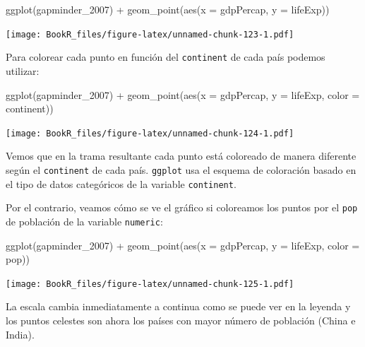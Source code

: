 \documentclass[
]{book}
\newenvironment{Shaded}{\begin{snugshade}}{\end{snugshade}}
\newcommand{\AttributeTok}[1]{\textcolor[rgb]{0.77,0.63,0.00}{#1}}
\newcommand{\FunctionTok}[1]{\textcolor[rgb]{0.00,0.00,0.00}{#1}}
\newcommand{\NormalTok}[1]{#1}
\newcommand{\SpecialCharTok}[1]{\textcolor[rgb]{0.00,0.00,0.00}{#1}}
\begin{document}
\begin{Shaded}
\begin{Highlighting}[]
\FunctionTok{ggplot}\NormalTok{(gapminder\_2007) }\SpecialCharTok{+} 
  \FunctionTok{geom\_point}\NormalTok{(}\FunctionTok{aes}\NormalTok{(}\AttributeTok{x =}\NormalTok{ gdpPercap, }\AttributeTok{y =}\NormalTok{ lifeExp))}
\end{Highlighting}
\end{Shaded}

\texttt{[image: BookR\_files/figure-latex/unnamed-chunk-123-1.pdf]}

Para colorear cada punto en función del \texttt{continent} de cada país podemos utilizar:

\begin{Shaded}
\begin{Highlighting}[]
\FunctionTok{ggplot}\NormalTok{(gapminder\_2007) }\SpecialCharTok{+} 
  \FunctionTok{geom\_point}\NormalTok{(}\FunctionTok{aes}\NormalTok{(}\AttributeTok{x =}\NormalTok{ gdpPercap, }\AttributeTok{y =}\NormalTok{ lifeExp,}
                 \AttributeTok{color =}\NormalTok{ continent))}
\end{Highlighting}
\end{Shaded}

\texttt{[image: BookR\_files/figure-latex/unnamed-chunk-124-1.pdf]}

Vemos que en la trama resultante cada punto está coloreado de manera diferente según el \texttt{continent} de cada país. \texttt{ggplot} usa el esquema de coloración basado en el tipo de datos categóricos de la variable \texttt{continent}.

Por el contrario, veamos cómo se ve el gráfico si coloreamos los puntos por el \texttt{pop} de población de la variable \texttt{numeric}:

\begin{Shaded}
\begin{Highlighting}[]
\FunctionTok{ggplot}\NormalTok{(gapminder\_2007) }\SpecialCharTok{+} 
  \FunctionTok{geom\_point}\NormalTok{(}\FunctionTok{aes}\NormalTok{(}\AttributeTok{x =}\NormalTok{ gdpPercap, }\AttributeTok{y =}\NormalTok{ lifeExp,}
                 \AttributeTok{color =}\NormalTok{ pop))}
\end{Highlighting}
\end{Shaded}

\texttt{[image: BookR\_files/figure-latex/unnamed-chunk-125-1.pdf]}

La escala cambia inmediatamente a continua como se puede ver en la leyenda y los puntos celestes son ahora los países con mayor número de población (China e India).
\end{document}
